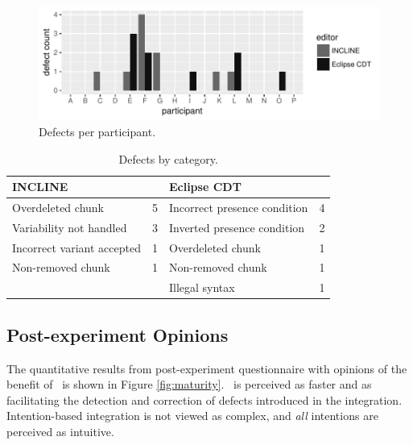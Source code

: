 \begin{figure}[ht]
    \centering
    \includegraphics{figure/incl-par-errors.pdf}
    \caption{Defects per participant.}
    \label{fig:paricipant-errors}
\end{figure}

\begin{table}[ht]
    \centering
    \caption{Defects by category.}
    \label{tab:defcat}
    \begin{tabular}{l l|l l}
    \hline
    \hline
        \textbf{INCLINE} & & \textbf{Eclipse CDT} & \\\hline
        Overdeleted chunk          & 5 & Incorrect presence condition & 4\\
        Variability not handled    & 3 & Inverted presence condition & 2\\
        Incorrect variant accepted & 1 & Overdeleted chunk & 1\\
        Non-removed chunk          & 1 & Non-removed chunk & 1\\
                                   &   & Illegal syntax & 1\\\hline\hline
    \end{tabular}
\end{table}

\subsection{Post-experiment Opinions}
The quantitative results from post-experiment questionnaire with opinions of the benefit of \tooln~is shown in Figure \ref{fig:maturity}. \tooln~is perceived as faster and as facilitating the detection and correction of defects introduced in the integration. Intention-based integration is not viewed as complex, and \textit{all} intentions are perceived as intuitive.

